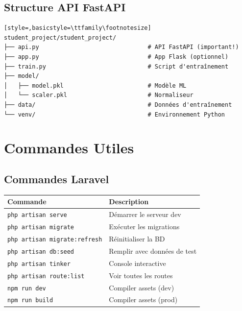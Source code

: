 \documentclass[12pt,a4paper]{article}
\begin{document}
\subsection{Structure API FastAPI}

\begin{lstlisting}[style=,basicstyle=\ttfamily\footnotesize]
student_project/student_project/
├── api.py                               # API FastAPI (important!)
├── app.py                               # App Flask (optionnel)
├── train.py                             # Script d'entraînement
├── model/
│   ├── model.pkl                        # Modèle ML
│   └── scaler.pkl                       # Normaliseur
├── data/                                # Données d'entraînement
└── venv/                                # Environnement Python
\end{lstlisting}

\newpage

\section{Commandes Utiles}

\subsection{Commandes Laravel}

\begin{table}[h]
\centering
\small
\begin{tabular}{|p{4cm}|p{8cm}|}
\hline
\textbf{Commande} & \textbf{Description} \\
\hline
\texttt{php artisan serve} & Démarrer le serveur dev \\
\hline
\texttt{php artisan migrate} & Exécuter les migrations \\
\hline
\texttt{php artisan migrate:refresh} & Réinitialiser la BD \\
\hline
\texttt{php artisan db:seed} & Remplir avec données de test \\
\hline
\texttt{php artisan tinker} & Console interactive \\
\hline
\texttt{php artisan route:list} & Voir toutes les routes \\
\hline
\texttt{npm run dev} & Compiler assets (dev) \\
\hline
\texttt{npm run build} & Compiler assets (prod) \\
\hline
\end{tabular}
\end{table}
\end{document}
